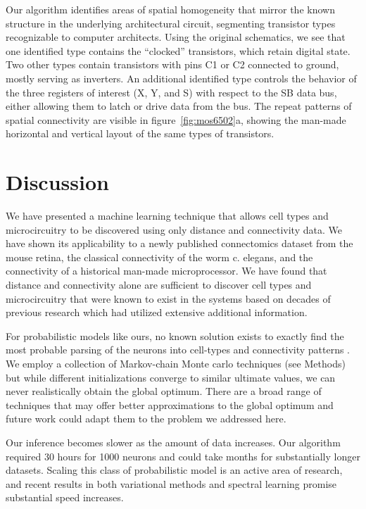 \documentclass{article}
\begin{document}
Our algorithm identifies areas of spatial homogeneity that mirror the
known structure in the underlying architectural circuit, segmenting
transistor types recognizable to computer architects. Using the
original schematics, we see that one identified type contains the
``clocked'' transistors, which retain digital state. Two other types
contain transistors with pins C1 or C2 connected to ground, mostly
serving as inverters.  An additional identified type controls the
behavior of the three registers of interest (X, Y, and S) with respect
to the SB data bus, either allowing them to latch or drive data from
the bus. The repeat patterns of spatial connectivity are visible in
figure~\ref{fig:mos6502}a, showing the man-made horizontal and
vertical layout of the same types of transistors.





\section{Discussion}
We have presented a machine learning technique that allows cell types
and microcircuitry to be discovered using only distance and
connectivity data. We have shown its applicability to a newly
published connectomics dataset from the mouse retina, the classical
connectivity of the worm c. elegans, and the connectivity of a
historical man-made microprocessor. We have found that distance and
connectivity alone are sufficient to discover cell types and
microcircuitry that were known to exist in the systems based on decades
of previous research which had utilized extensive additional
information.

For probabilistic models like ours, no known solution exists to
exactly find the most probable parsing of the neurons into cell-types
and connectivity patterns . We employ a collection of Markov-chain
Monte carlo techniques (see Methods) but while different
initializations converge to similar ultimate values, we can never
realistically obtain the global optimum. There are a broad range of
techniques that may offer better approximations to the global optimum
\autocite{Wanga2012} and future work could adapt them to
the problem we addressed here.

Our inference becomes slower as the amount of data increases. Our
algorithm required 30 hours for 1000 neurons and could take months for
substantially longer datasets. Scaling this class of probabilistic
model is an active area of research, and recent results in both
variational methods \autocite{Hoffman2013} and spectral learning
  \autocite{Anandkumar2012} promise substantial speed increases.
\end{document}
